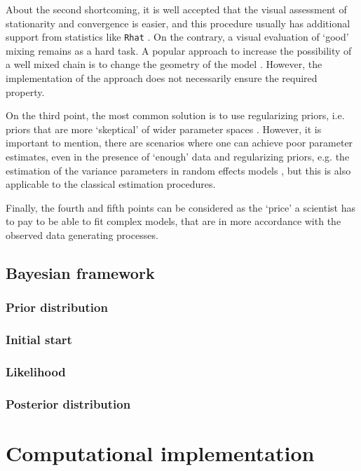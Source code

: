 About the second shortcoming, it is well accepted that the visual assessment of stationarity and convergence is easier, and this procedure usually has additional support from statistics like \texttt{Rhat} \cite{Gelman_et_al_2014}. On the contrary, a visual evaluation of `good' mixing remains as a hard task. A popular approach to increase the possibility of a well mixed chain is to change the geometry of the model \cite{McElreath_2020}. However, the implementation of the approach does not necessarily ensure the required property.

On the third point, the most common solution is to use regularizing priors, i.e. priors that are more `skeptical' of wider parameter spaces \cite{McElreath_2020}. However, it is important to mention, there are scenarios where one can achieve poor parameter estimates, even in the presence of `enough' data and regularizing priors, e.g. the estimation of the variance parameters in random effects models \cite{Skrondal_et_al_2004a}, but this is also applicable to the classical estimation procedures.

Finally, the fourth and fifth points can be considered as the `price' a scientist has to pay to be able to fit complex models, that are in more accordance with the observed data generating processes.


\subsection{Bayesian framework}

\subsubsection{Prior distribution}

\subsubsection{Initial start}

\subsubsection{Likelihood}

\subsubsection{Posterior distribution}


\section{Computational implementation} \label{sect:comp_imp}

